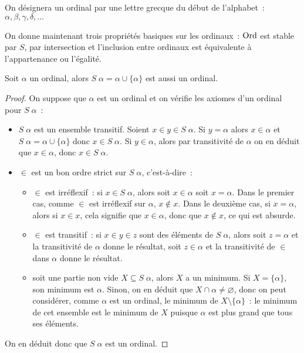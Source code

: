\begin{notation}
  On désignera un ordinal par une lettre grecque du début de l'alphabet~:
  $\alpha,\beta,\gamma,\delta,\ldots$
\end{notation}

On donne maintenant trois propriétés basiques sur les ordinaux~: $\operatorname{Ord}$ est
stable par $S$, par intersection et l'inclusion entre ordinaux est équivalente
à l'appartenance ou l'égalité.

\begin{proposition}
  Soit $\alpha$ un ordinal, alors $S\;\alpha = \alpha\cup\{\alpha\}$ est
  aussi un ordinal.
\end{proposition}

\begin{proof}
  On suppose que $\alpha$ est un ordinal et on vérifie les axiomes d'un ordinal
  pour $S\;\alpha$~:
  \begin{itemize}
  \item $S\;\alpha$ est un ensemble transitif. Soient $x\in y\in S\;\alpha$.
    Si $y = \alpha$ alors $x \in \alpha$ et $S\;\alpha = \alpha \cup\{\alpha\}$
    donc $x\in S\;\alpha$. Si $y \in \alpha$, alors par transitivité de $\alpha$
    on en déduit que $x\in \alpha$, donc $x\in S\;\alpha$.
  \item $\in$ est un bon ordre strict sur $S\;\alpha$, c'est-à-dire~:
    \begin{itemize}
    \item $\in$ est irréflexif~: si $x\in S\;\alpha$, alors soit $x\in\alpha$
      soit $x = \alpha$. Dans le premier cas, comme $\in$ est irréflexif sur
      $\alpha$, $x\notin x$. Dans le deuxième cas, si $x = \alpha$, alors
      si $x \in x$, cela signifie que $x \in \alpha$, donc que $x\notin x$, ce
      qui est absurde.
    \item $\in$ est transitif~: si $x \in y \in z$ sont des éléments de
      $S\;\alpha$, alors soit $z = \alpha$ et la transitivité de $\alpha$ donne
      le résultat, soit $z \in \alpha$ et la transitivité de $\in$ dans $\alpha$
      donne le résultat.
    \item soit une partie non vide $X\subseteq S\;\alpha$, alors $X$ a un
      minimum. Si $X = \{\alpha\}$, son minimum est $\alpha$. Sinon, on en
      déduit que $X\cap \alpha \neq\varnothing$, donc on peut considérer, comme
      $\alpha$ est un ordinal, le minimum de $X\setminus \{\alpha\}$~: le
      minimum de cet ensemble est le minimum de $X$ puisque $\alpha$ est
      plus grand que tous ses éléments.
    \end{itemize}
  \end{itemize}
  On en déduit donc que $S\;\alpha$ est un ordinal.
\end{proof}

